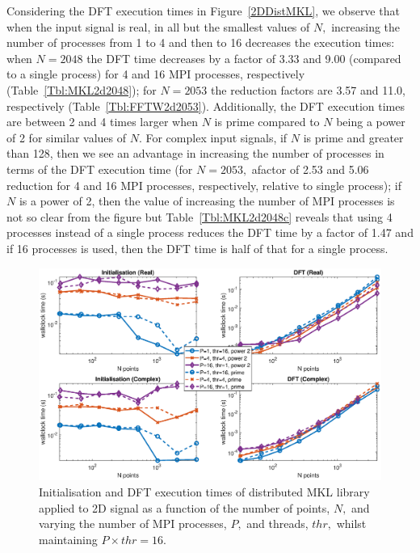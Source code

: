 \documentclass[a4paper]{article}
\begin{document}
Considering the DFT execution times in Figure~\ref{2DDistMKL}, we
observe that when the input signal is real, in all but the smallest
values of $N,$ increasing the number of processes from 1 to 4 and then
to 16 decreases the execution times: when $N=2048$ the DFT time
decreases by a factor of 3.33 and 9.00 (compared to a single process)
for 4 and 16 MPI processes, respectively (Table~\ref{Tbl:MKL2d2048});
for $N=2053$ the reduction factors are 3.57 and 11.0, respectively
(Table~\ref{Tbl:FFTW2d2053}). Additionally, the DFT execution times
are between 2 and 4 times larger when $N$ is prime compared to $N$
being a power of 2 for similar values of $N.$ For complex input
signals, if $N$ is prime and greater than 128, then we see an
advantage in increasing the number of processes in terms of the DFT
execution time (for $N=2053,$ afactor of 2.53 and 5.06 reduction for 4
and 16 MPI processes, respectively, relative to single process); if
$N$ is a power of 2, then the value of increasing the number of MPI
processes is not so clear from the figure but
Table~\ref{Tbl:MKL2d2048c} reveals that using 4 processes instead of a
single process reduces the DFT time by a factor of 1.47 and if 16
processes is used, then the DFT time is half of that for a single
process.


\begin{figure}[htb]
    \centering
    \includegraphics[width=0.9\linewidth]{../results/mkl_2d_mpi_thr.eps}
  \caption{Initialisation and DFT execution times of distributed MKL library applied to 2D signal as a function of the
    number of points, $N,$ and varying the number of MPI processes, $P,$ and threads, $thr,$ whilst maintaining $P\times thr=16.$}
  \label{2DDistMKL16}
\end{figure}
\end{document}
